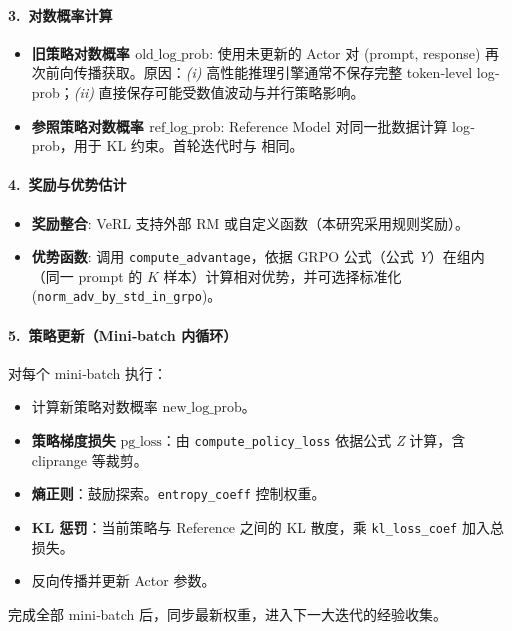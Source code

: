 \documentclass{pkuthesis}
\begin{document}
\paragraph{3.\ 对数概率计算}
\begin{itemize}
    \item \textbf{旧策略对数概率 $\text{old\_log\_prob}$}: 使用未更新的 Actor 对 (prompt, response) 再次前向传播获取。原因：\textit{(i)} 高性能推理引擎通常不保存完整 token‐level log‐prob；\textit{(ii)} 直接保存可能受数值波动与并行策略影响。
    \item \textbf{参照策略对数概率 $\text{ref\_log\_prob}$}: Reference Model 对同一批数据计算 log‐prob，用于 KL 约束。首轮迭代时与  相同。
\end{itemize}

\paragraph{4.\ 奖励与优势估计}
\begin{itemize}
    \item \textbf{奖励整合}: VeRL 支持外部 RM 或自定义函数（本研究采用规则奖励）。
    \item \textbf{优势函数}: 调用 \texttt{compute\_advantage}，依据 GRPO 公式（公式 \textit{Y}）在组内（同一 prompt 的 $K$ 样本）计算相对优势，并可选择标准化 (\texttt{norm\_adv\_by\_std\_in\_grpo})。
\end{itemize}

\paragraph{5.\ 策略更新（Mini‐batch 内循环）}
对每个 mini‐batch 执行：
\begin{itemize}
    \item 计算新策略对数概率 $\text{new\_log\_prob}$。
    \item \textbf{策略梯度损失} $\text{pg\_loss}$：由 \texttt{compute\_policy\_loss} 依据公式 \textit{Z} 计算，含 cliprange 等裁剪。
    \item \textbf{熵正则}：鼓励探索。\texttt{entropy\_coeff} 控制权重。
    \item \textbf{KL 惩罚}：当前策略与 Reference 之间的 KL 散度，乘 \texttt{kl\_loss\_coef} 加入总损失。
    \item 反向传播并更新 Actor 参数。
\end{itemize}
完成全部 mini‐batch 后，同步最新权重，进入下一大迭代的经验收集。

\end{document}
